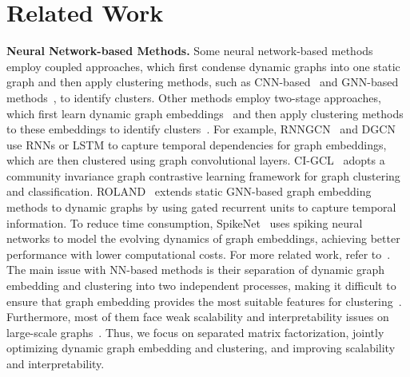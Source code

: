 \section{Related Work}
\label{related}

\textbf{Neural Network-based Methods.} 
Some neural network-based methods employ coupled approaches, which first condense dynamic graphs into one static graph and then apply clustering methods, such as CNN-based~\cite{9314087, DBLP:journals/kbs/SantoGMS21} and GNN-based 
methods~\cite{DBLP:journals/pami/ZhangNL23,zheng2022instant}, to identify clusters. 
Other methods employ two-stage approaches, which first learn dynamic graph embeddings~\cite{beer2023connecting,DBLP:conf/kdd/ZhangCFXZSC23,guo2022subset} and then apply clustering methods to these  embeddings to identify clusters~\cite{zhao2023spatial,DBLP:conf/KDD/CrossCityTransfer22,DBLP:journals/tnn/CuiLWZLWA24,Namyong,yang2024effective,chen2022efficient}.   
For example, RNNGCN~\cite{DBLP:conf/aaai/YaoJ21} and DGCN~\cite{DBLP:journals/tcyb/GaoZZWL23} use RNNs or LSTM to capture temporal dependencies for graph embeddings, which are then clustered using graph convolutional layers. 
CI-GCL~\cite{tan2024community} adopts a community invariance graph contrastive learning framework for graph clustering and classification.  
ROLAND~\cite{DBLP:conf/kdd/YouDL22} extends static GNN-based graph embedding methods to dynamic graphs by using gated recurrent units to capture temporal information. 
To reduce time consumption, SpikeNet~\cite{DBLP:conf/aaai/LiYZC0ZTWM23} uses spiking neural networks to model the evolving dynamics of graph embeddings, achieving better performance with lower computational costs. For more related work, refer to~\cite{cen2023cogdl,ZhangQianru,LiBolian,zhu2023wingnn}. 
The main issue with NN-based methods is their separation of dynamic graph embedding and clustering into two independent processes, making it difficult to ensure that graph embedding provides the most suitable features for clustering~\cite{DBLP:conf/ijcai/DongZSLC18,9531337}. Furthermore, most of them face weak scalability and interpretability issues on large-scale graphs~\cite{Hyenonsoo,WangCLZNL23}. 
Thus, we focus on separated matrix factorization, jointly optimizing dynamic graph embedding and clustering, and improving scalability and interpretability. %

